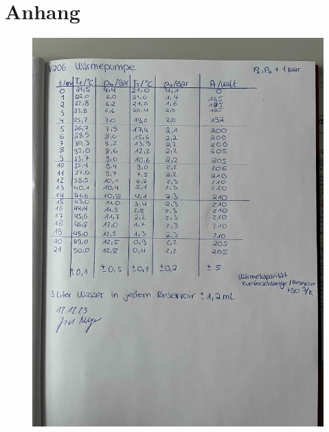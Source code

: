 \newpage
\section*{Anhang}
\label{sec:Anhang}
\begin{figure}
    \centering
    \includegraphics[width=\textwidth]{messdaten/Messdaten.jpg}
\end{figure}